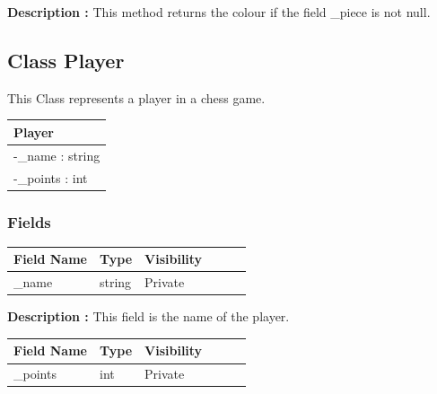 \documentclass[12pt]{article}
\begin{document}
\textbf{Description :} This method returns the colour if the field \_piece is not null.

\newpage


\subsection{Class Player}

This Class represents a player in a chess game.

\begin{table}[H]
    \begin{tabular}{|l|}
    \hline
    \rowcolor[HTML]{C0C0C0} 
    \textbf{Player}          \\ \hline
    \rowcolor[HTML]{EFEFEF}
    -\_name : string        \\ \hline
    -\_points : int         \\ \hline
    \end{tabular}
\end{table}

\subsubsection{Fields}

\begin{table}[H]
    \begin{tabular}{llllll}
    \hline
    \multicolumn{1}{|l|}{\cellcolor[HTML]{EFEFEF}\textbf{Field Name}} & \multicolumn{1}{l|}{\cellcolor[HTML]{EFEFEF}\textbf{Type}} & \multicolumn{1}{l|}{\cellcolor[HTML]{EFEFEF}\textbf{Visibility}} \\ \hline
    \multicolumn{1}{|l|}{\_name}                                      & \multicolumn{1}{l|}{string}                                & \multicolumn{1}{l|}{Private}                                     \\ \hline
    \end{tabular}
\end{table}

\textbf{Description :} This field is the name of the player.

\begin{table}[H]
    \begin{tabular}{llllll}
    \hline
    \multicolumn{1}{|l|}{\cellcolor[HTML]{EFEFEF}\textbf{Field Name}} & \multicolumn{1}{l|}{\cellcolor[HTML]{EFEFEF}\textbf{Type}} & \multicolumn{1}{l|}{\cellcolor[HTML]{EFEFEF}\textbf{Visibility}} \\ \hline
    \multicolumn{1}{|l|}{\_points}                                      & \multicolumn{1}{l|}{int}                                 & \multicolumn{1}{l|}{Private}                                   \\ \hline
    \end{tabular}
\end{table}
\end{document}
